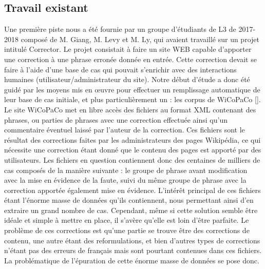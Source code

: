 \documentclass[11pt]{article}
\begin{document}
\subsection{Travail existant}

Une premi\`{e}re piste nous a \'{e}t\'{e} fournie par un groupe d'\'{e}tudiants de L3 de 2017-2018 compos\'{e} de M. Giang, M. Levy et M. Ly, qui avaient travaill\'{e} sur un projet intitul\'{e} Corrector. Le projet consistait \`{a} faire un site WEB capable d'apporter une correction \`{a} une phrase erron\'{e}e donn\'{e}e en entr\'{e}e. Cette correction devait se faire \`{a} l'aide d'une base de cas qui pouvait s'enrichir avec des interactions humaines (utilisateur/administrateur du site). 
\newline
\newline
Notre d\'{e}but d'\'{e}tude a donc \'{e}t\'{e} guid\'{e} par les moyens mis en {\oe}uvre pour effectuer un remplissage automatique de leur base de cas initiale, et plus particuli\`{e}rement un : les corpus de WiCoPaCo [\cite[1]{1}]. Le site WiCoPaCo met en libre acc\`{e}s des fichiers au format XML contenant des phrases, ou parties de phrases avec une correction effectu\'{e}e ainsi qu'un commentaire \'{e}ventuel laiss\'{e} par l'auteur de la correction. Ces fichiers sont le r\'{e}sultat des corrections faites par les administrateurs des pages Wikip\'{e}dia, ce qui n\'{e}cessite une correction \'{e}tant donn\'{e} que le contenu des pages est apport\'{e} par des utilisateurs. Les fichiers en question contiennent donc des centaines de milliers de cas compos\'{e}s de la mani\`{e}re suivante : le groupe de phrase avant modification avec la mise en \'{e}vidence de la faute, suivi du m\^{e}me groupe de phrase avec la correction apport\'{e}e \'{e}galement mise en \'{e}vidence. 
\newline
\newline
L'int\'{e}r\^{e}t principal de ces fichiers \'{e}tant l'\'{e}norme masse de donn\'{e}es qu'ils contiennent, nous permettant ainsi d'en extraire un grand nombre de cas. Cependant, m\^{e}me si cette solution semble \^{e}tre id\'{e}ale et simple \`{a} mettre en place, il s'av\`{e}re qu'elle est loin d'\^{e}tre parfaite. Le probl\`{e}me de ces corrections est qu'une partie se trouve \^{e}tre des corrections de contenu, une autre \'{e}tant des reformulations, et bien d'autres types de corrections n'\'{e}tant pas des erreurs de fran\c{c}ais mais sont pourtant contenues dans ces fichiers. La probl\'{e}matique de l'\'{e}puration de cette \'{e}norme masse de donn\'{e}es se pose donc.
\end{document}
